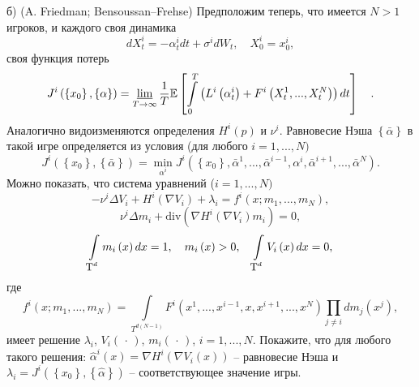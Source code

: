 \begin{problem}
б) (A. Friedman; Bensoussan--Frehse) Предположим теперь, что 
имеется $N>1$ игроков, и каждого своя динамика
\[
dX_t^i =-\alpha _t^i dt+\sigma ^idW_t ,
\quad
X_0^i =x_0^i ,
\]
своя функция потерь
\[
J^i\left( {\left\{ {x_0 } \right\},\left\{ \alpha \right\}} \right)=\mathop 
{\underline{\lim }}\limits_{T\to \infty } \frac{1}{T}\mathrm{{\mathbb E}} \left[ 
{\int\limits_0^T {\left( {L^i\left( {\alpha _t^i } \right)+F^i\left( {X_t^1 
,...,X_t^N } \right)} \right)dt} } \right]\quad .
\]
Аналогично видоизменяются определения $H^i\left( p \right)$ и $\nu ^i$. 
Равновесие Нэша $\left\{ {\bar {\alpha }} \right\}$ в такой игре 
определяется из условия (для любого $i=1,...,N)$
\[
J^i\left( {\left\{ {x_0 } \right\},\left\{ {\bar {\alpha }} \right\}} 
\right)=\mathop {\min }\limits_{\alpha ^i} J^i\left( {\left\{ {x_0 } 
\right\},\bar {\alpha }^1,...,\bar {\alpha }^{i-1},\alpha ^i,\bar {\alpha 
}^{i+1},...,\bar {\alpha }^N} \right).
\]
Можно показать, что система уравнений ($i=1,...,N)$
\[
-\nu ^i\Delta V_i +H^i\left( {\nabla V_i } \right)+\lambda _i =f^i\left( 
{x;m_1 ,...,m_N } \right),
\]
\[
\nu ^i\Delta m_i +\mbox{div}\left( {\nabla H^i\left( {\nabla V_i } 
\right)m_i } \right)=0,
\]
\[
\int\limits_{\small{\mbox{T}^d}} {m_i \left( x \right)dx} =1,
\quad
m_i \left( x \right)>0,
\quad
\int\limits_{\small{\mbox{T}^d}} {V_i \left( x \right)dx} =0,
\]
где
\[
f^i\left( {x;m_1 ,...,m_N } \right)=\int\limits_{T^{d\left( {N-1} \right)}} 
{F^i\left( {x^1,...,x^{i-1},x,x^{i+1},...,x^N} \right)\prod\limits_{j\ne i} 
{dm_j \left( {x^j} \right)} } ,
\]
имеет решение $\lambda _i $, $V_i \left( {\,\cdot \,} \right)$, $m_i \left( 
{\,\cdot \,} \right)$, $i=1,...,N$. Покажите, что для любого такого решения: 
$\hat {\alpha }^i\left( x \right)=\nabla H^i\left( {\nabla V_i \left( x 
\right)} \right)$ -- равновесие Нэша и $\lambda _i =J^i\left( {\left\{ {x_0 
} \right\},\left\{ {\hat {\alpha }} \right\}} \right)$ -- соответствующее 
значение игры.


\end{problem}
